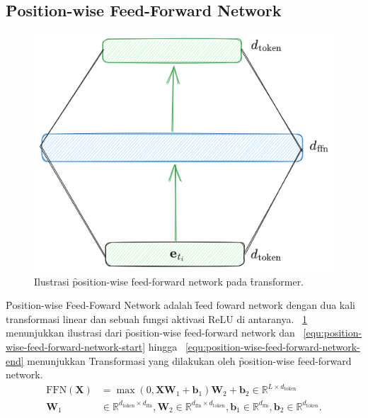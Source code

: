 \subsection{\f{Position-wise Feed-Forward Network}}
	\begin{figure}
		\centering
		\includegraphics[width=1\textwidth]{assets/pics/ffn_transformer.png}
		\caption{Ilustrasi \f{position-wise feed-forward network} pada \f{transformer}.}
		\label{fig:position-wise-feed-forward-network}
	\end{figure}
	\f{Position-wise Feed-Foward Network} adalah \f{feed foward network} dengan dua kali transformasi linear dan sebuah fungsi aktivasi ReLU di antaranya. \pic~\ref{fig:position-wise-feed-forward-network} menunjukkan ilustrasi dari \f{position-wise feed-forward network} dan \equ~\ref{equ:position-wise-feed-forward-network-start} hingga \equ~\ref{equ:position-wise-feed-forward-network-end} menunjukkan Transformasi yang dilakukan oleh \f{position-wise feed-forward network}.
	\begin{align}
		\label{equ:position-wise-feed-forward-network-start}
		\text{FFN}(\mathbf{X}) &= \max(0, \mathbf{X}\mathbf{W}_1 + \mathbf{b}_1)\mathbf{W}_2 + \mathbf{b}_2 \in \mathbb{R}^{L \times d_{\text{token}}} \\
		\label{equ:position-wise-feed-forward-network-end}
		\mathbf{W}_1 &\in \mathbb{R}^{d_{\text{token}} \times d_{\text{ffn}}}, \mathbf{W}_2 \in \mathbb{R}^{d_{\text{ffn}} \times d_{\text{token}}}, \mathbf{b}_1 \in \mathbb{R}^{d_{\text{ffn}}}, \mathbf{b}_2 \in \mathbb{R}^{d_{\text{token}}}.
	\end{align}

